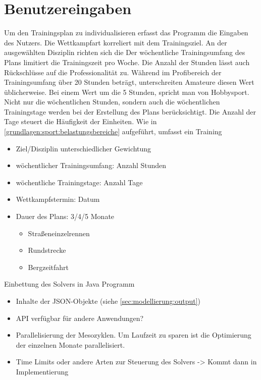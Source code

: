 \section{Benutzereingaben}
Um den Trainingsplan zu individualisieren erfasst das Programm die Eingaben des Nutzers. \newline
Die Wettkampfart korreliert mit dem Trainingsziel. An der ausgewählten Disziplin richten sich die \newline
Der wöchentliche Trainingsumfang des Plans limitiert die Trainingszeit pro Woche. Die Anzahl der Stunden lässt auch Rückschlüsse auf die Professionalität zu. Während im Profibereich der Trainingsumfang über 20 Stunden beträgt, unterschreiten Amateure diesen Wert üblicherweise. Bei einem Wert um die 5 Stunden, spricht man von Hobbysport. \newline
Nicht nur die wöchentlichen Stunden, sondern auch die wöchentlichen Trainingstage werden bei der Erstellung des Plans berücksichtigt. Die Anzahl der Tage steuert die Häufigkeit der Einheiten.
Wie in \ref{grundlagen:sport:belastungsbereiche} aufgeführt, umfasst ein Training 
\begin{itemize}
    \item Ziel/Disziplin \cite[S.11]{Radsporttraining} unterschiedlicher Gewichtung\cite[S.14]{Radsporttraining}
    \item wöchentlicher Trainingsumfang: Anzahl Stunden
    \item wöchentliche Trainingstage: Anzahl Tage
    \item Wettkampfstermin: Datum
    \item Dauer des Plans: 3/4/5 Monate
    \begin{itemize}
        \item Straßeneinzelrennen
        \item Rundstrecke
        \item Bergzeitfahrt
    \end{itemize}
\end{itemize}

Einbettung des Solvers in Java Programm
\begin{itemize}
    \item Inhalte der JSON-Objekte (siehe \ref{sec:modellierung:output})
    \item API verfügbar für andere Anwendungen?
    \item Parallelisierung der Mesozyklen. Um Laufzeit zu sparen ist die Optimierung der einzelnen Monate parallelisiert.
    \item Time Limits oder andere Arten zur Steuerung des Solvers -> Kommt dann in Implementierung
\end{itemize}

